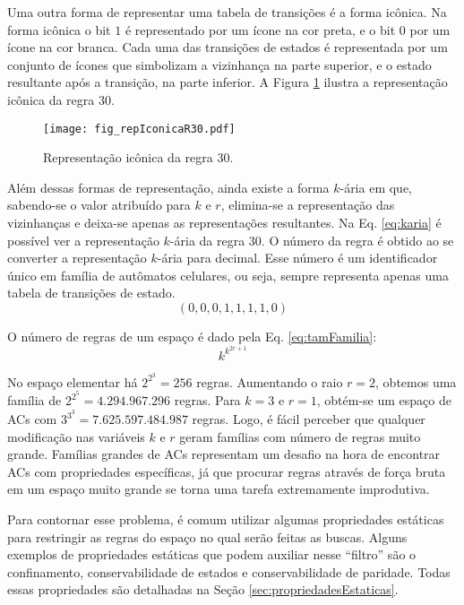Uma outra forma de representar uma tabela de transições é a forma icônica. Na forma icônica o bit $1$ é representado por um ícone na cor preta, e o bit $0$ por um ícone na cor branca. Cada uma das transições de estados é representada por um conjunto de ícones que simbolizam a vizinhança na parte superior, e o estado resultante após a transição, na parte inferior. A Figura \ref{fig:repIconicaR30} ilustra a representação icônica da regra 30.
	\begin{figure}[h!]
	  \centering
	  \texttt{[image: fig\_repIconicaR30.pdf]}
	  \caption{Representação icônica da regra 30.}
	  \label{fig:repIconicaR30}
	\end{figure}

Além dessas formas de representação, ainda existe a forma $k$-ária em que, sabendo-se o valor atribuído para $k$ e $r$, elimina-se a representação das vizinhanças e deixa-se apenas as representações resultantes. Na Eq. \eqref{eq:karia} é possível ver a representação $k$-ária da regra 30. O número da regra é obtido ao se converter a representação $k$-ária para decimal. Esse número é um identificador único em família de autômatos celulares, ou seja, sempre representa apenas uma tabela de transições de estado.
	\begin{equation}
	(0,0,0,1,1,1,1,0)
	\label{eq:karia}
	\end{equation}

O número de regras de um espaço é dado pela Eq. \eqref{eq:tamFamilia}:%
	\begin{equation}
	k^{k^{2r+1}}
	\label{eq:tamFamilia}
	\end{equation}

No espaço elementar há $2^{2^{3}} = 256$ regras. Aumentando o raio $r=2$, obtemos uma família de $2^{2^{5}} = 4.294.967.296$ regras. Para $k=3$ e $r=1$, obtém-se um espaço de ACs com $3^{3^{3}} = 7.625.597.484.987$ regras. Logo, é fácil perceber que qualquer modificação nas variáveis $k$ e $r$ geram famílias com número de regras muito grande. %
Famílias grandes de ACs representam um desafio na hora de encontrar ACs com propriedades específicas, já que procurar regras através de força bruta em um espaço muito grande se torna uma tarefa extremamente improdutiva. %

Para contornar esse problema, é comum utilizar algumas propriedades estáticas para restringir as regras do espaço no qual serão feitas as buscas. Alguns exemplos de propriedades estáticas que podem auxiliar nesse ``filtro'' são o confinamento, conservabilidade de estados e conservabilidade de paridade. Todas essas propriedades são detalhadas na Seção \ref{sec:propriedadesEstaticas}.

